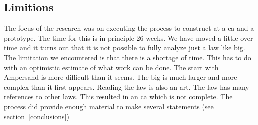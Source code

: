 \subsection{Limitions}\label{sbs:limitions}
The focus of the research was on executing the process to construct at a \acrshort{ca} and a prototype.
The time for this is in principle 26 weeks.
We have moved a little over time and it turns out that it is not possible to fully analyze just a law like \acrshort{big}.
The limitation we encountered is that there is a shortage of time.
This has to do with an optimistic estimate of what work can be done.
The start with Ampersand is more difficult than it seems.
The \acrshort{big} is much larger and more complex than it first appears.
Reading the law is also an art.
The law has many references to other laws.
This resulted in an \acrshort{ca} which is not complete.
The process did provide enough material to make several statements (see section~\ref{conclusions})

\begin{comment}
discussie voer

niet alle observaties zijn gebruikt

Een risico dat gelopen wordt door de moeilijke teksten is dat er niet zorgvuldig genoeg gelezen wordt en er eigen interpretatie plaatsvindt.
Dat risico neemt toe, naar mate het domein vertrouwder is voor de onderzoeker. 
Dus de keerzijde van de \acrshort{ar} aanpak is een bias op de inhoud.

De overall aanpak van de analyse van de wet is om eerst een overzicht te krijgen van de wet.
Het doorlopen van de wet en de highlights van de artikelen helder te krijgen.
Dit sluit aan bij het idee om de indeling op voorhand te maken


Vanuit verschillende interviews werd het statement gemaakt of \acrshort{big} wel de meest geschikte wet is om deze met Ampersand te analyseren.
Reden is dat de wet van orgine heel oud is~\ref{section:big}. 
De wet is verschillende malen bijgewerkt, maar de structuur is niet simpel om te zetten naar een ICT-systeem.
Daarnaast bevat de wet zeer veel impliciete en expliciete verwijzingen naar andere wet- en regelgeving.
En de wet is zelf niet expliciet genoeg.
Er zijn behoorlijk veel interpretatie mogelijkheden.
-> leidt tot sneller aansluiten bij de tot stand koming van de wet
-> vroegtijdige analyse van de haalbaarheid
-> alternatieve aanpak etc.
\end{comment}


